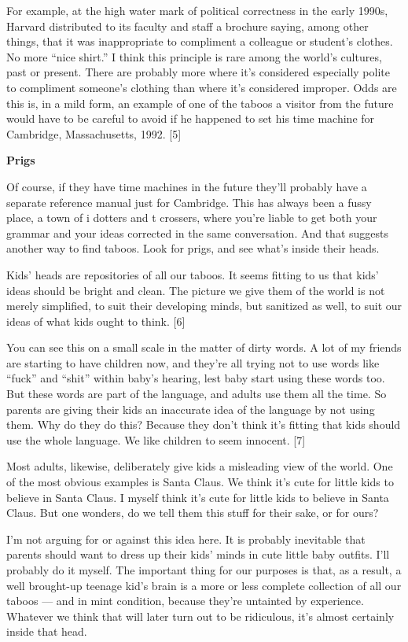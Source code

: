 For example, at the high water mark of political correctness in the
early 1990s, Harvard distributed to its faculty and staff a brochure
saying, among other things, that it was inappropriate to compliment a
colleague or student's clothes. No more ``nice shirt.'' I think this
principle is rare among the world's cultures, past or present. There are
probably more where it's considered especially polite to compliment
someone's clothing than where it's considered improper. Odds are this
is, in a mild form, an example of one of the taboos a visitor from the
future would have to be careful to avoid if he happened to set his time
machine for Cambridge, Massachusetts, 1992. {[}5{]}

\textbf{Prigs}

Of course, if they have time machines in the future they'll probably
have a separate reference manual just for Cambridge. This has always
been a fussy place, a town of i dotters and t crossers, where you're
liable to get both your grammar and your ideas corrected in the same
conversation. And that suggests another way to find taboos. Look for
prigs, and see what's inside their heads.

Kids' heads are repositories of all our taboos. It seems fitting to us
that kids' ideas should be bright and clean. The picture we give them of
the world is not merely simplified, to suit their developing minds, but
sanitized as well, to suit our ideas of what kids ought to think.
{[}6{]}

You can see this on a small scale in the matter of dirty words. A lot of
my friends are starting to have children now, and they're all trying not
to use words like ``fuck'' and ``shit'' within baby's hearing, lest baby
start using these words too. But these words are part of the language,
and adults use them all the time. So parents are giving their kids an
inaccurate idea of the language by not using them. Why do they do this?
Because they don't think it's fitting that kids should use the whole
language. We like children to seem innocent. {[}7{]}

Most adults, likewise, deliberately give kids a misleading view of the
world. One of the most obvious examples is Santa Claus. We think it's
cute for little kids to believe in Santa Claus. I myself think it's cute
for little kids to believe in Santa Claus. But one wonders, do we tell
them this stuff for their sake, or for ours?

I'm not arguing for or against this idea here. It is probably inevitable
that parents should want to dress up their kids' minds in cute little
baby outfits. I'll probably do it myself. The important thing for our
purposes is that, as a result, a well brought-up teenage kid's brain is
a more or less complete collection of all our taboos --- and in mint
condition, because they're untainted by experience. Whatever we think
that will later turn out to be ridiculous, it's almost certainly inside
that head.


